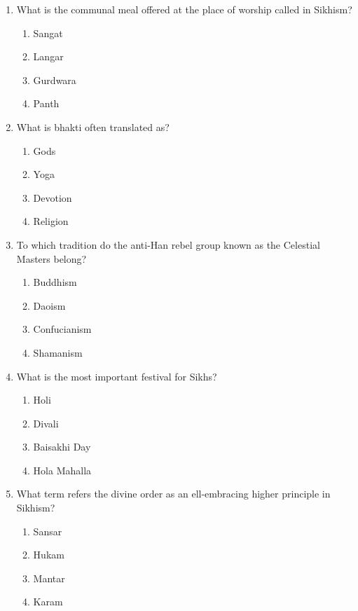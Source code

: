 \documentclass[12pt]{article}
\begin{document}
\begin{enumerate}[label=\arabic*.]
\begin{enumerate}[label=(\alph*)]
    \item Non-action
    \item Heart-mind
    \item World
\end{enumerate}
\item What is the communal meal offered at the place of worship called in Sikhism?
\begin{enumerate}[label=(\alph*)]
    \item Sangat
    \item Langar
    \item Gurdwara
    \item Panth
\end{enumerate}
\item What is bhakti often translated as?
\begin{enumerate}[label=(\alph*)]
    \item Gods
    \item Yoga
    \item Devotion
    \item Religion
\end{enumerate}
\item To which tradition do the anti-Han rebel group known as the Celestial Masters belong?
\begin{enumerate}[label=(\alph*)]
    \item Buddhism
    \item Daoism
    \item Confucianism
    \item Shamanism
\end{enumerate}
\item What is the most important festival for Sikhs?
\begin{enumerate}[label=(\alph*)]
    \item Holi
    \item Divali
    \item Baisakhi Day
    \item Hola Mahalla
\end{enumerate}
\item What term refers the divine order as an ell-embracing higher principle in Sikhism?
\begin{enumerate}[label=(\alph*)]
    \item Sansar
    \item Hukam
    \item Mantar
    \item Karam
\end{enumerate}
\end{enumerate}
\end{document}
